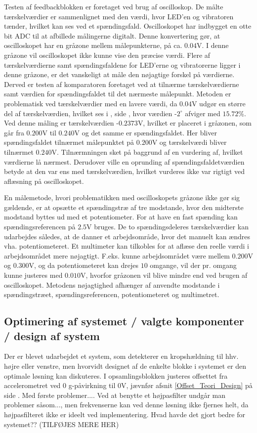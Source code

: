 Testen af feedbackblokken er foretaget ved brug af oscilloskop. De målte tærskelværdier er sammenlignet med den værdi, hvor LED'en og vibratoren tænder, hvilket kan ses ved et spændingsfald. Oscilloskopet har indbygget en otte bit ADC til at afbillede målingerne digitalt. Denne konvertering gør, at oscilloskopet har en gråzone mellem målepunkterne, på ca. $0.04$V. I denne gråzone vil oscilloskopet ikke kunne vise den præcise værdi. Flere af tærskelværdierne samt spændingsfaldene for LED'erne og vibratorerne ligger i denne gråzone, er det vanskeligt at måle den nøjagtige forskel på værdierne. Derved er testen af komparatoren foretaget ved at tilnærme tærskelværdierne samt værdien for spændingsfaldet til det nærmeste målepunkt. Metoden er problematisk ved tærskelværdier med en lavere værdi, da $0.04$V udgør en større del af tærskelværdien, hvilket ses i , side \pageref{Tab:test-taendsluk}, hvor værdien -$2^{\circ}$ afviger med $15.72$\%. Ved denne måling er tærskelværdien -$0.2373$V, hvilket er placeret i gråzonen, som går fra $0.200$V til $0.240$V og det samme er spændingsfaldet. Her bliver spændingsfaldet tilnærmet målepunktet på $0.200$V og tærskelværdi bliver tilnærmet $0.240$V. Tilnærmningen sket på baggrund af en vurdering af, hvilket værdierne lå nærmest. Derudover ville en oprunding af spændingsfaldetværdien betyde at den var ens med tærskelværdien, hvilket vurderes ikke var rigtigt ved aflæsning på oscilloskopet. 

En målemetode, hvori problematikken med oscilloskopets gråzone ikke gør sig gældende, er at opsætte et spændingstræ af tre modstande, hvor den midterste modstand byttes ud med et potentiometer. For at have en fast spænding kan spændingsreferencen på $2.5$V bruges. De to spændingsdeleres tærskelværdier kan udarbejdes således, at de danner et arbejdsområde, hvor det manuelt kan ændres vha. potentiometeret. Et multimeter kan tilkobles for at aflæse den reelle værdi i arbejdsområdet mere nøjagtigt. F.eks. kunne arbejdsområdet være mellem $0.200$V og $0.300$V, og da potentiometeret kan drejes $10$ omgange, vil der pr. omgang kunne justeres med $0.010$V, hvorfor gråzonen vil blive mindre end ved brugen af oscilloskopet. Metodens nøjagtighed afhænger af anvendte modstande i spændingstræet, spændingsreferencen, potentiometeret og multimetret. 

\subsection{Optimering af systemet / valgte komponenter / design af system}
Der er blevet udarbejdet et system, som detekterer en kropshældning til hhv. højre eller venstre, men hvorvidt designet af de enkelte blokke i systemet er den optimale løsning kan diskuteres. I opsamlingsblokken justeres offsettet fra accelerometret ved $0$ g-påvirkning til $0$V, jævnfør afsnit \ref{Offset_Teori_Design} på side \pageref{Offset_Teori_Design}. Med første problemer.... Ved at benytte et højpasfilter undgår man problemer såsom..., men frekvenserne kan ved denne løsning ikke fjernes helt, da højpasfilteret ikke er ideelt ved implementering. Hvad havde det gjort bedre for systemet?? (TILFØJES MERE HER)


